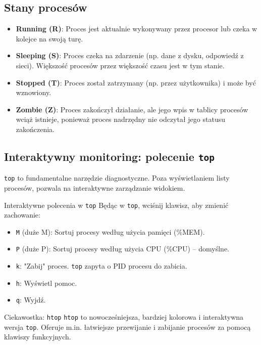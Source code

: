 \subsection{Stany procesów}
\begin{itemize}
    \item \textbf{Running (R)}: Proces jest aktualnie wykonywany przez procesor lub czeka w kolejce na swoją turę.
    \item \textbf{Sleeping (S)}: Proces czeka na zdarzenie (np. dane z dysku, odpowiedź z sieci). Większość procesów przez większość czasu jest w tym stanie.
    \item \textbf{Stopped (T)}: Proces został zatrzymany (np. przez użytkownika) i może być wznowiony.
    \item \textbf{Zombie (Z)}: Proces zakończył działanie, ale jego wpis w tablicy procesów wciąż istnieje, ponieważ proces nadrzędny nie odczytał jego statusu zakończenia.
\end{itemize}

\subsection{Interaktywny monitoring: polecenie \texttt{top}}
\texttt{top} to fundamentalne narzędzie diagnostyczne. Poza wyświetlaniem listy procesów, pozwala na interaktywne zarządzanie widokiem.
\begin{importantbox}{Interaktywne polecenia w \texttt{top}}
Będąc w \texttt{top}, wciśnij klawisz, aby zmienić zachowanie:
\begin{itemize}
    \item \texttt{M} (duże M): Sortuj procesy według użycia pamięci (\%MEM).
    \item \texttt{P} (duże P): Sortuj procesy według użycia CPU (\%CPU) -- domyślne.
    \item \texttt{k}: "Zabij" proces. \texttt{top} zapyta o PID procesu do zabicia.
    \item \texttt{h}: Wyświetl pomoc.
    \item \texttt{q}: Wyjdź.
\end{itemize}
\end{importantbox}
\begin{definitionbox}{Ciekawostka: \texttt{htop}}
\texttt{htop} to nowocześniejsza, bardziej kolorowa i interaktywna wersja \texttt{top}. Oferuje m.in. łatwiejsze przewijanie i zabijanie procesów za pomocą klawiszy funkcyjnych.
\end{definitionbox}

